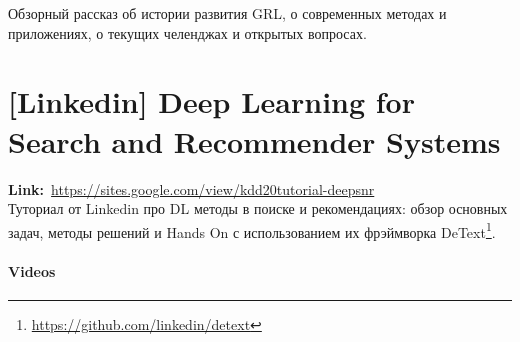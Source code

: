 Обзорный рассказ об истории развития GRL, о современных методах и приложениях, о текущих челенджах и открытых вопросах.


\section*{[Linkedin] Deep Learning for Search and Recommender Systems} 

\textbf{Link:}~\url{https://sites.google.com/view/kdd20tutorial-deepsnr} \\

Туториал от Linkedin про DL методы в поиске и рекомендациях: обзор основных задач, методы решений и Hands On с использованием их фрэймворка DeText\footnote{\url{https://github.com/linkedin/detext}}.

\paragraph{Videos}

